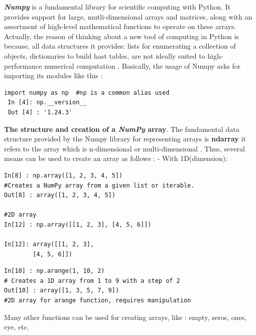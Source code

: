 \documentclass[12pt,a4paper]{report}
\begin{document}
 \textbf{\textit{Numpy}} is a fundamental library for scientific computing with Python. It provides support for large, mutli-dimensional arrays and matrices, along with an assortment of high-level mathematical functions to operate on these arrays.\newline 
 Actually, the reason of thinking about a new tool of computing in Python is because, all  data structures it provides: lists for enumerating a collection of objects, dictionaries to build hast tables, are not ideally suited to high-performance numerical computation \cite{van2011numpy}.\newline 
 Basically, the usage of Numpy asks for importing its modules like this :  
 \begin{lstlisting}[style=stylepython]
 import numpy as np  #np is a common alias used  
 In [4]: np.__version__
 Out [4] : '1.24.3'
 \end{lstlisting} 
 \textbf{The structure and creation of a \textit{NumPy} array}. \newline 
 The fundamental data structure provided by the Numpy library for representing arrays is \textbf{ndarray} it refers to the array which is n-dimensional or multi-dimensional \cite{coursAnalyseDonne2}. Thus, several means can be used to create an array as follows  : \newline
 - With 1D(dimension):
 \begin{lstlisting}[style=stylepython]
In[8] : np.array([1, 2, 3, 4, 5])
#Creates a NumPy array from a given list or iterable.
Out[8] : array([1, 2, 3, 4, 5]) 

#2D array
In[12] : np.array([[1, 2, 3], [4, 5, 6]])

In[12]: array([[1, 2, 3],
		[4, 5, 6]])
 \end{lstlisting}
 \begin{lstlisting}[style=stylepython]
In[10] : np.arange(1, 10, 2)  
# Creates a 1D array from 1 to 9 with a step of 2
Out[10] : array([1, 3, 5, 7, 9]) 
#2D array for arange function, requires manipulation
 \end{lstlisting} 
  Many other functions can be used for creating arrays, like : empty, zeros, ones, eye, etc. \\
  
\end{document}
